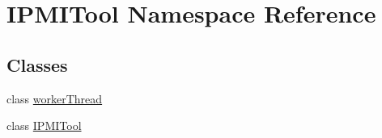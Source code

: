 \hypertarget{namespaceIPMITool}{\section{I\-P\-M\-I\-Tool Namespace Reference}
\label{namespaceIPMITool}
}
\subsection*{Classes}
\begin{DoxyCompactItemize}
\item 
class \hyperlink{classIPMITool_1_1workerThread}{worker\-Thread}
\item 
class \hyperlink{classIPMITool_1_1IPMITool}{I\-P\-M\-I\-Tool}
\end{DoxyCompactItemize}
